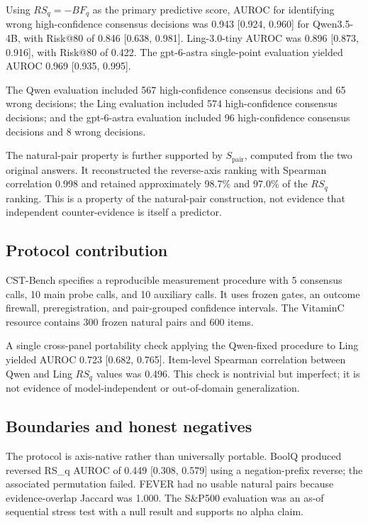 \documentclass[11pt]{article}
\begin{document}
Using \(RS_q=-BF_q\) as the primary predictive score, AUROC for identifying wrong high-confidence consensus decisions was 0.943 [0.924, 0.960] for Qwen3.5-4B, with Risk@80 of 0.846 [0.638, 0.981]. Ling-3.0-tiny AUROC was 0.896 [0.873, 0.916], with Risk@80 of 0.422. The gpt-6-astra single-point evaluation yielded AUROC 0.969 [0.935, 0.995].

The Qwen evaluation included 567 high-confidence consensus decisions and 65 wrong decisions; the Ling evaluation included 574 high-confidence consensus decisions; and the gpt-6-astra evaluation included 96 high-confidence consensus decisions and 8 wrong decisions.

The natural-pair property is further supported by \(S_{\text{pair}}\), computed from the two original answers. It reconstructed the reverse-axis ranking with Spearman correlation 0.998 and retained approximately 98.7\% and 97.0\% of the \(RS_q\) ranking. This is a property of the natural-pair construction, not evidence that independent counter-evidence is itself a predictor.

\subsection{Protocol contribution}

CST-Bench specifies a reproducible measurement procedure with 5 consensus calls, 10 main probe calls, and 10 auxiliary calls. It uses frozen gates, an outcome firewall, preregistration, and pair-grouped confidence intervals. The VitaminC resource contains 300 frozen natural pairs and 600 items.

A single cross-panel portability check applying the Qwen-fixed procedure to Ling yielded AUROC 0.723 [0.682, 0.765]. Item-level Spearman correlation between Qwen and Ling \(RS_q\) values was 0.496. This check is nontrivial but imperfect; it is not evidence of model-independent or out-of-domain generalization.

\subsection{Boundaries and honest negatives}

The protocol is axis-native rather than universally portable. BoolQ produced reversed RS\_\allowbreak{}q AUROC of 0.449 [0.308, 0.579] using a negation-prefix reverse; the associated permutation failed. FEVER had no usable natural pairs because evidence-overlap Jaccard was 1.000. The S\&P500 evaluation was an as-of sequential stress test with a null result and supports no alpha claim.
\end{document}
